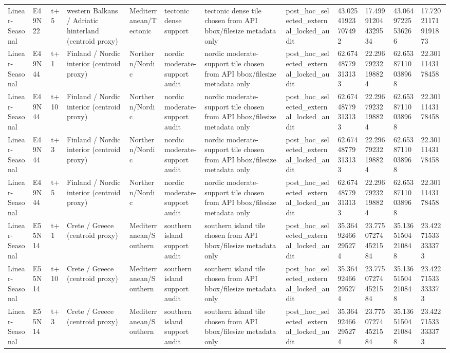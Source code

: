 \begin{landscape}
\begin{longtable}{llllllllllll}
Linear-Seasonal & E49N22 & t+5 & western Balkans / Adriatic hinterland (centroid proxy) & Mediterranean/Tectonic & tectonic dense support & tectonic dense tile chosen from API bbox/filesize metadata only & post\_hoc\_selected\_external\_locked\_audit & 43.02541923707492 & 17.499912044329534 & 43.06497225536266 & 17.720211719191873 \\
Linear-Seasonal & E49N44 & t+1 & Finland / Nordic interior (centroid proxy) & Northern/Nordic & nordic moderate-support audit & nordic moderate-support tile chosen from API bbox/filesize metadata only & post\_hoc\_selected\_external\_locked\_audit & 62.67448779313133 & 22.29679232198824 & 62.65387110038968 & 22.3011143178458 \\
Linear-Seasonal & E49N44 & t+10 & Finland / Nordic interior (centroid proxy) & Northern/Nordic & nordic moderate-support audit & nordic moderate-support tile chosen from API bbox/filesize metadata only & post\_hoc\_selected\_external\_locked\_audit & 62.67448779313133 & 22.29679232198824 & 62.65387110038968 & 22.3011143178458 \\
Linear-Seasonal & E49N44 & t+3 & Finland / Nordic interior (centroid proxy) & Northern/Nordic & nordic moderate-support audit & nordic moderate-support tile chosen from API bbox/filesize metadata only & post\_hoc\_selected\_external\_locked\_audit & 62.67448779313133 & 22.29679232198824 & 62.65387110038968 & 22.3011143178458 \\
Linear-Seasonal & E49N44 & t+5 & Finland / Nordic interior (centroid proxy) & Northern/Nordic & nordic moderate-support audit & nordic moderate-support tile chosen from API bbox/filesize metadata only & post\_hoc\_selected\_external\_locked\_audit & 62.67448779313133 & 22.29679232198824 & 62.65387110038968 & 22.3011143178458 \\
Linear-Seasonal & E55N14 & t+1 & Crete / Greece (centroid proxy) & Mediterranean/Southern & southern island support audit & southern island tile chosen from API bbox/filesize metadata only & post\_hoc\_selected\_external\_locked\_audit & 35.36492466295274 & 23.775072744521584 & 35.13651504210848 & 23.42271533333373 \\
Linear-Seasonal & E55N14 & t+10 & Crete / Greece (centroid proxy) & Mediterranean/Southern & southern island support audit & southern island tile chosen from API bbox/filesize metadata only & post\_hoc\_selected\_external\_locked\_audit & 35.36492466295274 & 23.775072744521584 & 35.13651504210848 & 23.42271533333373 \\
Linear-Seasonal & E55N14 & t+3 & Crete / Greece (centroid proxy) & Mediterranean/Southern & southern island support audit & southern island tile chosen from API bbox/filesize metadata only & post\_hoc\_selected\_external\_locked\_audit & 35.36492466295274 & 23.775072744521584 & 35.13651504210848 & 23.42271533333373 \\

\end{longtable}
\end{landscape}
